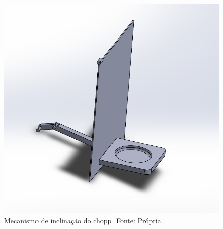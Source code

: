   \begin{figure}[H]
    \centering
    \includegraphics[scale= 0.5]{figuras/estrutura/mecanismo-inclinacao.png}
    \caption{Mecanismo de inclinação do chopp. Fonte: Própria.}
    \label{modelagem}
  \end{figure}



  
